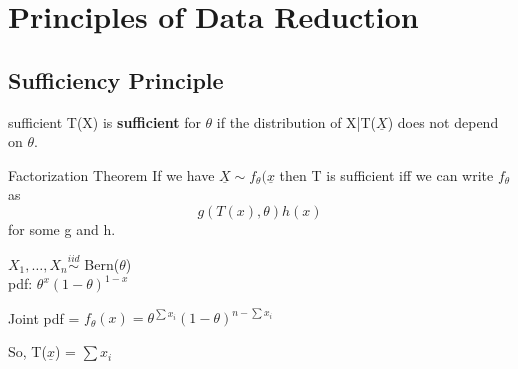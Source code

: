 \documentclass[11pt,fleqn]{book} %
\begin{document}





\chapter{Principles of Data Reduction}

\section{Sufficiency Principle}

\begin{definition}{sufficient}
	T(X) is \textbf{sufficient} for $\theta$ if the distribution of X|T($\underline{X}$) does not depend on $\theta$.  
\end{definition}

\begin{theorem}{Factorization Theorem}
	If we have $\underline{X} \sim f_\theta(\underline{x}$ then T is sufficient iff we can write $f_\theta$ as
	$$g(T(x),\theta)h(x)$$
	for some g and h.
\end{theorem}

\begin{example}
	$X_1, \dots, X_n \stackrel{iid}{\sim}$ Bern($\theta$)\\
	pdf: $\theta^x(1-\theta)^{1-x}$

	Joint pdf = $f_\theta(x) = \theta^{\sum x_i}(1-\theta)^{n-\sum x_i}$

	So, T($\underline{x}$) = $\sum x_i$
\end{example}
\end{document}
